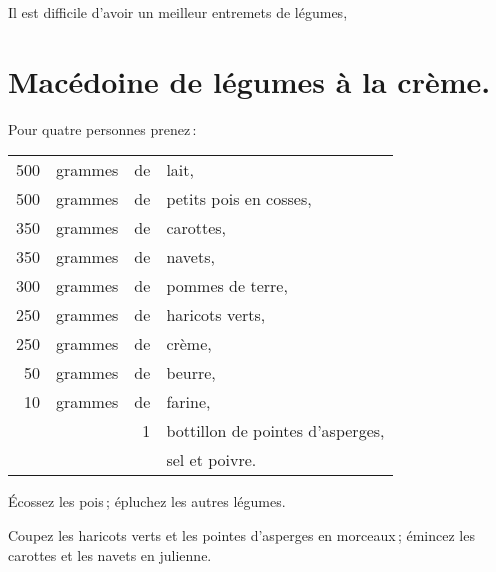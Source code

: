 Il est difficile d'avoir un meilleur entremets de légumes,

\section*{\centering Macédoine de légumes à la crème.}
{}
\label{pg0773} \hypertarget{p0773}{}

Pour quatre personnes prenez :

\footnotesize
\begin{longtable}{rrrp{16em}}
    500 & grammes & de & lait,                                                                            \\
    500 & grammes & de & petits pois en cosses,                                                           \\
    350 & grammes & de & carottes,                                                                        \\
    350 & grammes & de & navets,                                                                          \\
    300 & grammes & de & pommes de terre,                                                                 \\
    250 & grammes & de & haricots verts,                                                                  \\
    250 & grammes & de & crème,                                                                           \\
     50 & grammes & de & beurre,                                                                          \\
     10 & grammes & de & farine,                                                                          \\
        &         &  1 & bottillon de pointes d'asperges,                                                 \\
        &         &    & sel et poivre.                                                                   \\
\end{longtable}
\normalsize

Écossez les pois ; épluchez les autres légumes.

Coupez les haricots verts et les pointes d'asperges en morceaux ; émincez les
carottes et les navets en julienne.

